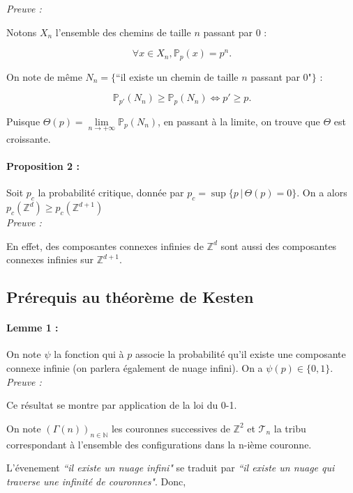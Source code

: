 \documentclass[11pt,a4paper]{article}
\begin{document}
\emph{Preuve :}

Notons $X_n$ l'ensemble des chemins de taille $n$ passant par $0$ :

\[\forall x \in X_n, \mathbb{P}_p\left(x\right) = p^n.\]

On note de même $N_n = \{$``il existe un chemin de taille $n$ passant par $0$"$ \}$ :

\[\mathbb{P}_{p'}\left(N_n\right) \ge \mathbb{P}_{p}\left(N_n\right)\Leftrightarrow p'\ge p.\]

Puisque $\Theta\left(p\right) = \underset{n \to +\infty}{\lim} \mathbb{P}_{p}\left(N_n\right)$, en passant à la limite, on trouve que $\Theta$ est croissante.

\paragraph{Proposition 2 :}
Soit $p_c$ la probabilité critique, donnée par $p_c = \sup\{p \,|\, \Theta\left(p\right) = 0\}$. On a alors $p_c\left(\mathbb{Z}^{d}\right) \ge p_c\left(\mathbb{Z}^{d+1}\right)$
\\

\emph{Preuve :}

En effet, des composantes connexes  infinies  de $\mathbb{Z}^d$ sont aussi des composantes connexes  infinies sur $\mathbb{Z}^{d+1}$.

\subsection{Prérequis au théorème de Kesten}

\paragraph{Lemme 1 :}

On note $\psi$ la fonction qui à $p$ associe la probabilité qu'il existe une composante connexe  infinie (on parlera également de nuage infini). On a $\psi\left(p\right) \in \{0,1\}$.
\\

\emph{Preuve : }

Ce résultat se montre par application de la loi du 0-1. 

On note $\left(\Gamma\left(n\right)\right)_{n\in\mathbb{N}}$ les couronnes successives de $\mathbb{Z}^2$ et $\mathcal{T}_n$ la tribu correspondant à l'ensemble des configurations dans la n-ième couronne.

L'évenement \emph{``il existe un nuage infini"} se traduit par \emph{``il existe un nuage qui traverse une infinité de couronnes"}. Donc, 
\end{document}
